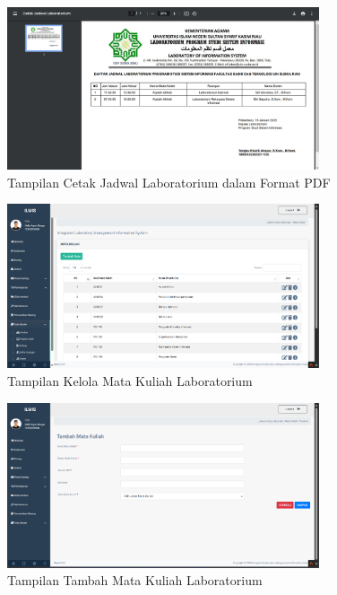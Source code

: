 \begin{figure}
	\centering
	\includegraphics[width=0.82\textwidth]{konten/gambar/hasil/cetak-jadwal.png}
	\caption{Tampilan Cetak Jadwal Laboratorium dalam Format PDF}
	\label{fig:cetak-jadwal}
\end{figure}

\begin{figure}
	\centering
	\includegraphics[width=0.82\textwidth]{konten/gambar/hasil/matkul.png}
	\caption{Tampilan Kelola Mata Kuliah Laboratorium}
	\label{fig:matkul}
\end{figure}

\begin{figure}
	\centering
	\includegraphics[width=0.82\textwidth]{konten/gambar/hasil/tambah-matkul.png}
	\caption{Tampilan Tambah Mata Kuliah Laboratorium}
	\label{fig:tambah-matkul}
\end{figure}

